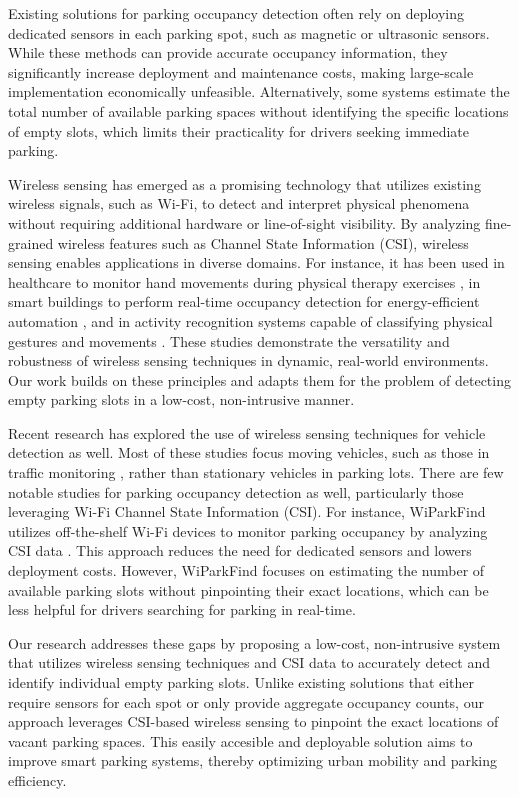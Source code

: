 Existing solutions for parking occupancy detection often rely on deploying dedicated sensors in each parking spot, such as magnetic or ultrasonic sensors. While these methods can provide accurate occupancy information, they significantly increase deployment and maintenance costs, making large-scale implementation economically unfeasible\cite{Polycarpou2013SmartPS}. Alternatively, some systems estimate the total number of available parking spaces without identifying the specific locations of empty slots, which limits their practicality for drivers seeking immediate parking.


Wireless sensing has emerged as a promising technology that utilizes existing wireless signals, such as Wi-Fi, to detect and interpret physical phenomena without requiring additional hardware or line-of-sight visibility. By analyzing fine-grained wireless features such as Channel State Information (CSI), wireless sensing enables applications in diverse domains. For instance, it has been used in healthcare to monitor hand movements during physical therapy exercises \cite{10.1145/3688855}, in smart buildings to perform real-time occupancy detection for energy-efficient automation \cite{10.1145/3555776.3577841}, and in activity recognition systems capable of classifying physical gestures and movements \cite{ZHURAVCHAK202259}. These studies demonstrate the versatility and robustness of wireless sensing techniques in dynamic, real-world environments. Our work builds on these principles and adapts them for the problem of detecting empty parking slots in a low-cost, non-intrusive manner.

Recent research has explored the use of wireless sensing techniques for vehicle detection as well. Most of these studies focus moving vehicles, such as those in traffic monitoring \cite{Won2017WiTrafficLA}, rather than stationary vehicles in parking lots. There are few notable studies for parking occupancy detection as well, particularly those leveraging Wi-Fi Channel State Information (CSI). For instance, WiParkFind utilizes off-the-shelf Wi-Fi devices to monitor parking occupancy by analyzing CSI data \cite{8422973}. This approach reduces the need for dedicated sensors and lowers deployment costs. However, WiParkFind focuses on estimating the number of available parking slots without pinpointing their exact locations, which can be less helpful for drivers searching for parking in real-time.

Our research addresses these gaps by proposing a low-cost, non-intrusive system that utilizes wireless sensing techniques and CSI data to accurately detect and identify individual empty parking slots. Unlike existing solutions that either require sensors for each spot or only provide aggregate occupancy counts, our approach leverages CSI-based wireless sensing to pinpoint the exact locations of vacant parking spaces. This easily accesible and deployable solution aims to improve smart parking systems, thereby optimizing urban mobility and parking efficiency.


